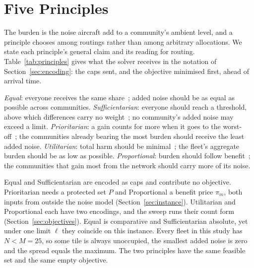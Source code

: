 \section{Five Principles}
\label{sec:principles}

The burden is the noise aircraft add to a community's ambient level, and a principle
chooses among routings rather than among arbitrary allocations. We state each principle's
general claim and its reading for routing. Table~\ref{tab:principles} gives what the
solver receives in the notation of Section~\ref{sec:encoding}: the caps sent, and the
objective minimised first, ahead of arrival time.

\emph{Equal}: everyone receives the same share~\cite{dworkin1981}; added noise should be
as equal as possible across communities. \emph{Sufficientarian}: everyone should reach a
threshold, above which differences carry no weight~\cite{frankfurt1987}; no community's
added noise may exceed a limit. \emph{Prioritarian}: a gain counts for more when it goes
to the worst-off~\cite{parfit1997,rawls1971}; the communities already bearing the most
burden should receive the least added noise. \emph{Utilitarian}: total harm should be
minimal~\cite{mill1863}; the fleet's aggregate burden should be as low as possible.
\emph{Proportional}: burden should follow benefit~\cite{aristotleNE,young1994}; the
communities that gain most from the network should carry more of its noise.

Equal and Sufficientarian are encoded as caps and contribute no objective. Prioritarian
needs a protected set $P$ and Proportional a benefit price $\pi_m$, both inputs from
outside the noise model (Section~\ref{sec:instance}). Utilitarian and Proportional each
have two encodings, and the sweep runs their count form
(Section~\ref{sec:objectives}). Equal is comparative and
Sufficientarian absolute, yet under one limit $\ell$ they coincide on this instance.
Every fleet in this study has $N<M=25$, so some tile is always unoccupied, the smallest
added noise is zero and the spread equals the maximum. The two principles have the same
feasible set and the same empty objective.

